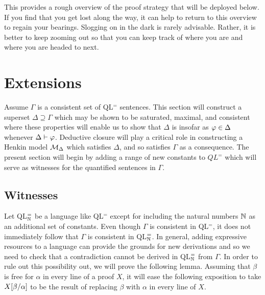 This provides a rough overview of the proof strategy that will be deployed below.
If you find that you get lost along the way, it can help to return to this overview to regain your bearings.
Slogging on in the dark is rarely advisable.
Rather, it is better to keep zooming out so that you can keep track of where you are and where you are headed to next.







\section{Extensions}%
  \label{sec:Extensions}

Assume $\Gamma$ is a consistent set of QL$^=$ sentences.
This section will construct a superset $\Delta\supseteq\Gamma$ which may be shown to be saturated, maximal, and consistent where these properties will enable us to show that $\Delta$ is  insofar as $\varphi\in\Delta$ whenever $\Delta\vdash\varphi$. 
Deductive closure will play a critical role in constructing a Henkin model $\mathcal{M}_\Delta$ which satisfies $\Delta$, and so satisfies $\Gamma$ as a consequence. 
The present section will begin by adding a range of new constants to $QL^=$ which will serve as witnesses for the quantified sentences in $\Gamma$.





\subsection{Witnesses}%
  \label{sub:Witnesses}
  

Let QL$^=_{\mathbb{N}}$ be a language like QL$^=$ except for including the natural numbers $\mathbb{N}$ as an additional set of constants.
Even though $\Gamma$ is consistent in QL$^=$, it does not immediately follow that $\Gamma$ is consistent in QL$^=_{\mathbb{N}}$.
In general, adding expressive resources to a language can provide the grounds for new derivations and so we need to check that a contradiction cannot be derived in QL$^=_{\mathbb{N}}$ from $\Gamma$.
In order to rule out this possibility out, we will prove the following lemma.
Assuming that $\beta$ is free for $\alpha$ in every line of a proof $X$, it will ease the following exposition to take $X[\beta/\alpha]$ to be the result of replacing $\beta$ with $\alpha$ in every line of $X$.

